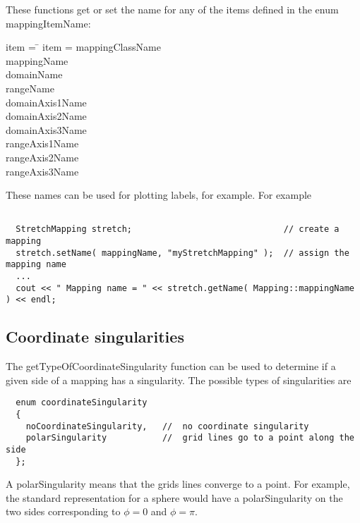 \documentclass[xcolor=rgb,svgnames,dvipsnames]{article}
\begin{document}
These functions get or set the name for any of the items defined in the
enum {\ff mappingItemName}:
\begin{tabbing}
{\ff item =}   \= \kill
{\ff item =}   \>  {\ff mappingClassName } \\
               \>  {\ff mappingName } \\
               \>  {\ff domainName } \\
               \>  {\ff rangeName } \\
               \>  {\ff domainAxis1Name } \\
               \>  {\ff domainAxis2Name } \\
               \>  {\ff domainAxis3Name } \\
               \>  {\ff rangeAxis1Name } \\
               \>  {\ff rangeAxis2Name } \\
               \>  {\ff rangeAxis3Name } \\
\end{tabbing}
These names can be used for plotting labels, for example.
For example
{\footnotesize
\begin{verbatim}

  StretchMapping stretch;                              // create a mapping
  stretch.setName( mappingName, "myStretchMapping" );  // assign the mapping name
  ...
  cout << " Mapping name = " << stretch.getName( Mapping::mappingName ) << endl;

\end{verbatim}
}


\subsection{ Coordinate singularities }

The {\ff getTypeOfCoordinateSingularity} function can be used
to determine if a given side of a mapping has a singularity.
The possible types of singularities are 
{\footnotesize
\begin{verbatim}
  enum coordinateSingularity
  {
    noCoordinateSingularity,   //  no coordinate singularity
    polarSingularity           //  grid lines go to a point along the side
  };

\end{verbatim}
}
A {\ff polarSingularity} means that the grids lines converge to a point.
For example, the standard representation for a sphere would have
a {\ff polarSingularity} on the two sides corresponding to 
$\phi=0$ and $\phi=\pi$.
\end{document}
